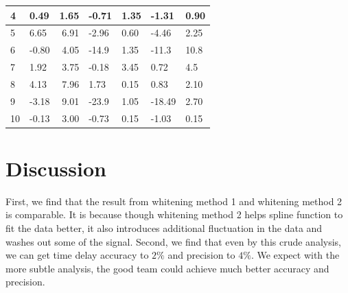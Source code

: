 \documentclass[\docopts]{\docclass}
\begin{document}
\begin{table}[ht!]
\begin{tabular}{|l|l|r|l|l|l|l|}
4                                           & 0.49                   & 1.65                                                 & -0.71                   & 1.35                            & -1.31                   & 0.90                            \\ \hline
5                                           & 6.65                   & 6.91                                                 & -2.96                   & 0.60                            & -4.46                   & 2.25                            \\ \hline
6                                           & -0.80                  & 4.05                                                 & -14.9                   & 1.35                            & -11.3                  & 10.8                            \\ \hline
7                                           & 1.92                   & 3.75                                                 & -0.18                   & 3.45                            & 0.72                    & 4.5                             \\ \hline
8                                           & 4.13                   & 7.96                                                 & 1.73                    & 0.15                            & 0.83                    & 2.10                            \\ \hline
9                                           & -3.18                  & 9.01                                                 & -23.9                   & 1.05                            & -18.49                  & 2.70                            \\ \hline
10                                          & -0.13                  & 3.00                                                 & -0.73                   & 0.15                            & -1.03                   & 0.15                            \\ \hline
\end{tabular}
\end{table}

\section{Discussion}
\label{sec:discussion}

First, we find that the result from whitening method 1 and whitening method 2 is comparable. It is because though whitening method 2 helps spline function to fit the data better, it also introduces additional fluctuation in the data and washes out some of the signal. Second, we find that even by this crude analysis, we can get time delay accuracy to $2\%$ and precision to $4\%$. We expect with the more subtle analysis, the good team could achieve much better accuracy and precision.  
\end{document}

